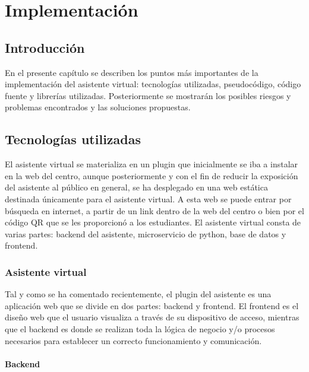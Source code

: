 \chapter{Implementación}
\label{chap:implementation}



\section{Introducción}


En el presente capítulo se describen los puntos más importantes de la implementación del asistente virtual: tecnologías utilizadas, pseudocódigo, código fuente y librerías utilizadas. Posteriormente se mostrarán los posibles riesgos y problemas encontrados y las soluciones propuestas.

\section{Tecnologías utilizadas}

El asistente virtual se materializa en un plugin que inicialmente se iba a instalar en la web del centro, aunque posteriormente y con el fin de reducir la exposición del asistente al público en general, se ha desplegado en una web estática destinada únicamente para el asistente virtual. A esta web se puede entrar por búsqueda en internet, a partir de un link dentro de la web del centro o bien por el código QR que se les proporcionó a los estudiantes. El asistente virtual consta de varias partes: backend del asistente, microservicio de python, base de datos y frontend.

\subsection{Asistente virtual}

Tal y como se ha comentado recientemente, el plugin del asistente es una aplicación web que se divide en dos partes: backend y frontend. El frontend es el diseño web que el usuario visualiza a través de su dispositivo de acceso, mientras que el backend es donde se realizan toda la lógica de negocio y/o procesos necesarios para establecer un correcto funcionamiento y comunicación.

\subsubsection{Backend}

